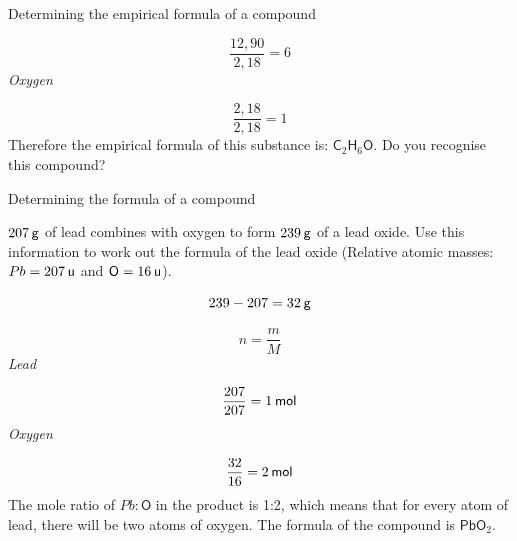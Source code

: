 \begin{wex}{Determining the empirical formula of a compound }
{    \begin{equation}
    \frac{12,90}{2,18}=6
      \end{equation}
      \label{m38712*id281254}
        \textsl{Oxygen}
      \par 
      \label{m38712*id281261}\nopagebreak\noindent{}
        
    \begin{equation}
    \frac{2,18}{2,18}=1
      \end{equation}
      \label{m38712*id281292}Therefore the empirical formula of this substance is: ${\mathsf{C}}_{2}{\mathsf{H}}_{6}\mathsf{O}$. Do you recognise this compound?\par 
}
    \end{wex}
    \noindent
\label{m38712*secfhsst!!!underscore!!!id1235}\vspace{.5cm} 
      \noindent
      \begin{wex}{Determining the formula of a compound }{
      \label{m38712*probfhsst!!!underscore!!!id1236}
      \label{m38712*id281333}$207\phantom{\rule{2pt}{0ex}}\mathsf{g}$ of lead combines with oxygen to form $239\phantom{\rule{2pt}{0ex}}\mathsf{g}$ of a lead oxide. Use this information to work out the formula of the lead oxide (Relative atomic masses: $Pb=207\phantom{\rule{2pt}{0ex}}\mathsf{u}$ and $\mathsf{O}=16\phantom{\rule{2pt}{0ex}}\mathsf{u}$).\par 
}
{
      \label{m38712*id281379}\nopagebreak\noindent{}
    \begin{equation}
    239-207=32\phantom{\rule{2pt}{0ex}}\mathsf{g}
      \end{equation}
      \label{m38712*id281407}\nopagebreak\noindent{}
        
    \begin{equation}
    n=\frac{m}{M}
      \end{equation}
      \label{m38712*id281427}
        \textsl{Lead}
      \par 
      \label{m38712*id281433}\nopagebreak\noindent{}
        
    \begin{equation}
    \frac{207}{207}=1\phantom{\rule{2pt}{0ex}}\mathsf{mol}
      \end{equation}
      \label{m38712*id281460}
        \textsl{Oxygen}
      \par 
      \label{m38712*id281467}\nopagebreak\noindent{}
        
    \begin{equation}
    \frac{32}{16}=2\phantom{\rule{2pt}{0ex}}\mathsf{mol}
      \end{equation}
      \label{m38712*id281498}The mole ratio of $Pb:\mathsf{O}$ in the product is 1:2, which means that for every atom of lead, there will be two atoms of oxygen. The formula of the compound is $\mathsf{PbO}{}_{2}$.\par 
}
    \end{wex}
